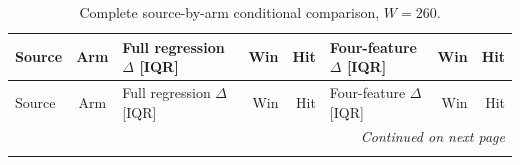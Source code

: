 \documentclass[10pt,a4paper]{article}
\begin{document}
\begingroup
\fontsize{9}{10.2}\selectfont
\setlength{\tabcolsep}{2.2pt}
\renewcommand{\arraystretch}{1.05}
\setlength{\LTpre}{2pt}
\setlength{\LTpost}{3pt}
\begin{longtable}{lcp{37mm}rrp{37mm}rr}
\caption{Complete source-by-arm conditional comparison, $W=260$.}\label{tab:v9-stability-w260}\\
\toprule
Source & Arm & Full regression $\Delta$ [IQR] & Win & Hit & Four-feature $\Delta$ [IQR] & Win & Hit\\
\midrule
\endfirsthead
\toprule
Source & Arm & Full regression $\Delta$ [IQR] & Win & Hit & Four-feature $\Delta$ [IQR] & Win & Hit\\
\midrule
\endhead
\midrule
\multicolumn{8}{r}{\emph{Continued on next page}}\\
\endfoot
\bottomrule
\endlastfoot

\end{longtable}
\end{document}
